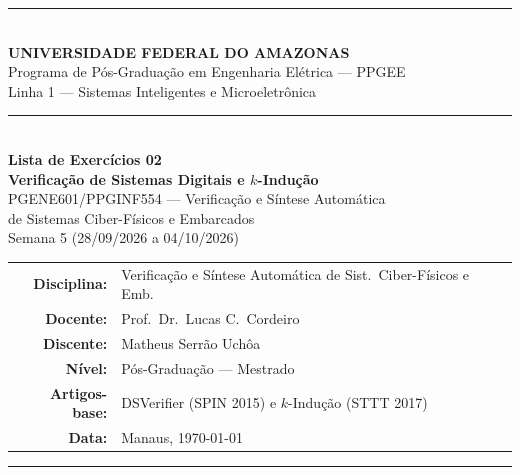 \documentclass[12pt,a4paper]{article}
\begin{document}
\begin{titlepage}
\centering
\vspace*{0.5cm}

{\color{ufamblue}\rule{\linewidth}{2pt}}\\[0.4cm]
{\Large\bfseries\color{ufamblue} UNIVERSIDADE FEDERAL DO AMAZONAS}\\[0.2cm]
{\large\color{ufamblue} Programa de P\'os-Gradua\c{c}\~ao em Engenharia El\'etrica --- PPGEE}\\[0.1cm]
{\large\color{ufamblue} Linha 1 --- Sistemas Inteligentes e Microeletr\^onica}\\[0.4cm]
{\color{ufamblue}\rule{\linewidth}{2pt}}\\[2.5cm]

{\LARGE\bfseries Lista de Exerc\'icios 02}\\[0.4cm]
{\Large\bfseries Verifica\c{c}\~ao de Sistemas Digitais e $k$-Indu\c{c}\~ao}\\[0.4cm]
{\large PGENE601/PPGINF554 --- Verifica\c{c}\~ao e S\'intese Autom\'atica}\\[0.1cm]
{\large de Sistemas Ciber-F\'isicos e Embarcados}\\[0.4cm]
{\normalsize Semana 5 (28/09/2026 a 04/10/2026)}\\[3cm]

\begin{tabular}{rl}
  \textbf{Disciplina:} & Verifica\c{c}\~ao e S\'intese Autom\'atica de Sist.\ Ciber-F\'isicos e Emb. \\[0.3cm]
  \textbf{Docente:}    & Prof.\ Dr.\ Lucas C.\ Cordeiro \\[0.3cm]
  \textbf{Discente:}   & Matheus Serr\~ao Uch\^oa \\[0.3cm]
  \textbf{N\'ivel:}    & P\'os-Gradua\c{c}\~ao --- Mestrado \\[0.3cm]
  \textbf{Artigos-base:} & DSVerifier (SPIN 2015) e $k$-Indu\c{c}\~ao (STTT 2017) \\[0.3cm]
  \textbf{Data:}       & Manaus, \today \\
\end{tabular}

\vfill
{\color{ufamblue}\rule{\linewidth}{1.5pt}}
\end{titlepage}

\newpage
\tableofcontents
\newpage

\end{document}
